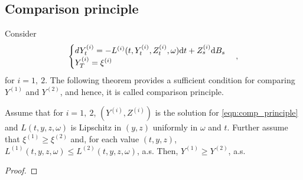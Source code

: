 \documentclass[11pt]{book}
\newcommand{\dd}{\text{\normalfont d}}
\newcommand{\dt}{\text{\normalfont d}t}
\begin{document}
\subsection{Comparison principle}\label{sec:comp_principle}
Consider 
\begin{equation}\label{eqn:comp_principle}
	\begin{cases}
		dY^{(i)}_t=-L^{(i)}(t,Y^{(i)}_t,Z^{(i)}_t,\omega){{\dt}}+Z^{(i)}_s{\dd}B_s\\
		Y^{(i)}_T=\xi^{(i)}
	\end{cases},
\end{equation}
for $i=1,~2$. The following theorem provides a sufficient condition for comparing $Y^{(1)}$ and $Y^{(2)}$, and hence, it is called comparison principle.
\begin{thm}\label{thm:comp_principle}
Assume that for $i=1,~2$, $(Y^{(i)},Z^{(i)})$ is the solution for \eqref{eqn:comp_principle} and $L(t,y,z,\omega)$ is Lipschitz in $(y,z)$ uniformly in $\omega$ and $t$.
	Further assume that $\xi^{(1)}\ge\xi^{(2)}$ and, for each value $(t,y,z)$, $L^{(1)}(t,y,z,\omega)\le L^{(2)}(t,y,z,\omega)$, a.s.
	Then, $Y^{(1)}\ge Y^{(2)}$, a.s.
\end{thm}
\begin{proof}
	
\end{proof}

\end{document}
